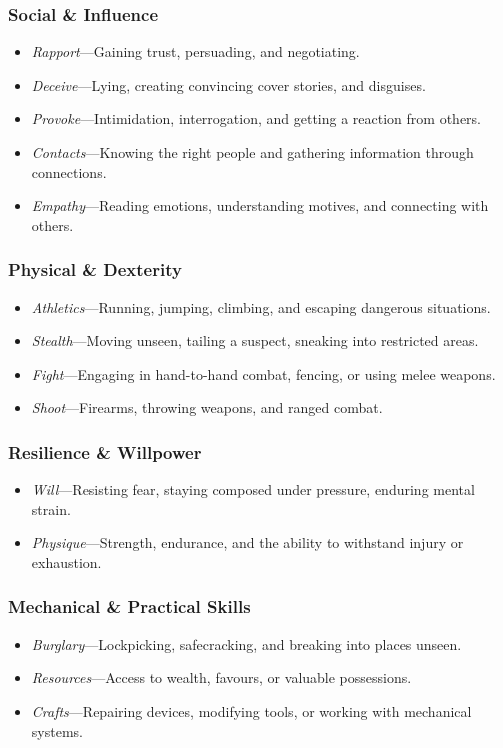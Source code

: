 \subsubsection*{Social \& Influence}  
\begin{itemize}\raggedright
    \item \emph{Rapport}---Gaining trust, persuading, and negotiating.
    \item \emph{Deceive}---Lying, creating convincing cover stories, and disguises.
    \item \emph{Provoke}---Intimidation, interrogation, and getting a reaction from others.
    \item \emph{Contacts}---Knowing the right people and gathering information through connections.
    \item \emph{Empathy}---Reading emotions, understanding motives, and connecting with others.
\end{itemize}

\subsubsection*{Physical \& Dexterity}  
\begin{itemize}\raggedright
    \item \emph{Athletics}---Running, jumping, climbing, and escaping dangerous situations.
    \item \emph{Stealth}---Moving unseen, tailing a suspect, sneaking into restricted areas.
    \item \emph{Fight}---Engaging in hand-to-hand combat, fencing, or using melee weapons.
    \item \emph{Shoot}---Firearms, throwing weapons, and ranged combat.
\end{itemize}

\subsubsection*{Resilience \& Willpower}
\begin{itemize}\raggedright
    \item \emph{Will}---Resisting fear, staying composed under pressure, enduring mental strain.
    \item \emph{Physique}---Strength, endurance, and the ability to withstand injury or exhaustion.
\end{itemize}

\subsubsection*{Mechanical \& Practical Skills}  
\begin{itemize}\raggedright
    \item \emph{Burglary}---Lockpicking, safecracking, and breaking into places unseen.
    \item \emph{Resources}---Access to wealth, favours, or valuable possessions.
    \item \emph{Crafts}---Repairing devices, modifying tools, or working with mechanical systems.
\end{itemize}

